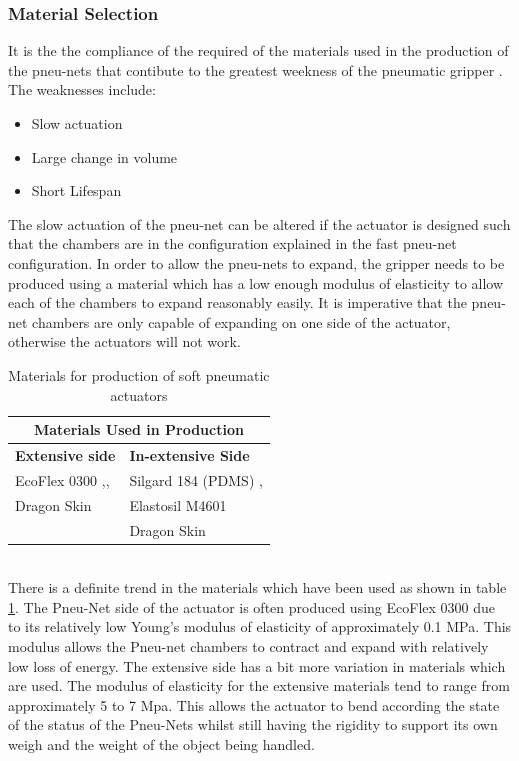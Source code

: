 \documentclass[11pt]{article}
\begin{document}
\subsubsection{Material Selection}
It is the the compliance of the required of the materials used in the production of the pneu-nets that contibute to the greatest weekness of the pneumatic gripper \cite{shepherd2011multigait}. The weaknesses include:
\begin{itemize}
\item Slow actuation
\item Large change in volume
\item Short Lifespan
\end{itemize}
The slow actuation of the pneu-net can be altered if the actuator is designed such that the chambers are in the configuration explained in the fast pneu-net configuration. In order to allow the pneu-nets to expand, the gripper needs to be produced using a material which has a low enough modulus of elasticity to allow each of the chambers to expand reasonably easily. It is imperative that the pneu-net chambers are only capable of expanding on one side of the actuator, otherwise the actuators will not work.
\begin{table}[h!]
\caption{Materials for production of soft pneumatic actuators}
\label{Pneumatic_table}
\begin{center}
\begin{tabular}{ |p{6cm}|p{6cm}| }
 \hline
 \multicolumn{2}{|c|}{\textbf{Materials Used in Production}} \\
 \hline
 \textbf{Extensive side} & \textbf{In-extensive Side}\\
 \hline
 EcoFlex 0300 \cite{ilievski2011soft},\cite{bilodeau2015monolithic},\cite{mosadegh2014pneumatic}   & Silgard 184 (PDMS)  \cite{ilievski2011soft},\cite{bilodeau2015monolithic} \\
 Dragon Skin \cite{hao2016universal} &   Elastosil M4601 \cite{mosadegh2014pneumatic}\\
 & Dragon Skin \cite{hao2016universal}\\
 \hline
\end{tabular}
\end{center}
\end{table}
\\
\newline
There is a definite trend in the materials which have been used as shown in table \ref{Pneumatic_table}. The Pneu-Net side of the actuator is often produced using EcoFlex 0300 due to its relatively low Young's modulus of elasticity of approximately 0.1 MPa. This modulus allows the Pneu-net chambers to contract and expand with relatively low loss of energy. The extensive side has a bit more variation in materials which are used. The modulus of elasticity for the extensive materials tend to range from approximately 5 to 7 Mpa. This allows the actuator to bend according the state of the status of the Pneu-Nets whilst still having the rigidity to support its own weigh and the weight of the object being handled.
\end{document}
